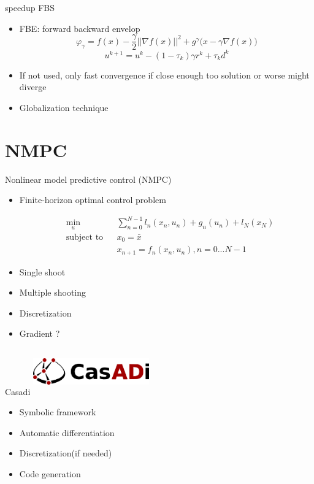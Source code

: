\documentclass[11pt,t]{beamer}
\begin{document}
\begin{frame}{speedup FBS}
\begin{itemize}
	\item FBE: forward backward envelop
	\begin{equation}
	\varphi_{\gamma} = f(x) - \frac{\gamma}{2}||\nabla f(x)||^2 + g^{\gamma} \big(x-\gamma \nabla f(x) \big)
	\label{eq:smoothed opti problem}
	\end{equation}
	\begin{equation}
	u^{k+1} = u^k - (1-\tau_k)\gamma r^k + \tau_kd^k
	\label{eq:PANOC convex combination}
	\end{equation}
	\item If not used, only fast convergence if close enough too solution or worse might diverge
	\item Globalization technique
	
\end{itemize}
\end{frame}

\section{NMPC}
\begin{frame}{Nonlinear model predictive control (NMPC)}
	\begin{itemize}
		\item Finite-horizon optimal control problem
		
		\begin{equation}
		\begin{aligned}
		& \underset{u}{\text{min}}	&& \sum_{n=0}^{N-1}l_n(x_n,u_n) + g_n(u_n) + l_N(x_N) \\
		& \text{subject to}			&& x_0 = \bar{x} \\
		& 							&&  x_{n+1} = f_n(x_n,u_n), n=0...N-1
		\end{aligned}
		\end{equation}
		\item Single shoot
		\item Multiple shooting
		\item Discretization
		\item Gradient ?
	\end{itemize}
\end{frame}

\begin{frame}{Casadi}
	\centering
	\includegraphics[width=5cm, height=2cm]{casadi.png}
	\begin{itemize}
		\item Symbolic framework
		\item Automatic differentiation
		\item Discretization(if needed)
		\item Code generation
	\end{itemize}
\end{frame}
\end{document}
